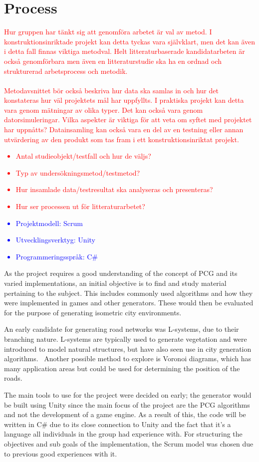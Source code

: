 \section{Process}
\textcolor{red}{
Hur gruppen har tänkt sig att genomföra arbetet är val av metod. I konstruktionsinriktade projekt kan detta tyckas vara självklart, men det kan även i detta fall finnas viktiga metodval. Helt litteraturbaserade kandidatarbeten är också genomförbara men även en litteraturstudie ska ha en ordnad och strukturerad arbetsprocess och metodik.
\\\\
Metodavsnittet bör också beskriva hur data ska samlas in och hur det konstateras hur väl projektets mål har uppfyllts. I praktiska projekt kan detta vara genom mätningar av olika typer. Det kan också vara genom datorsimuleringar. Vilka aspekter är viktiga för att veta om syftet med projektet har uppnåtts? Datainsamling kan också vara en del av en testning eller annan utvärdering av den produkt som tas fram i ett konstruktionsinriktat projekt.
\begin{itemize}
    \item Antal studieobjekt/testfall och hur de väljs?
    \item Typ av undersökningsmetod/testmetod? 
    \item Hur insamlade data/testresultat ska analyseras och presenteras? 
    \item Hur ser processen ut för litteraturarbetet?
\end{itemize}
}
\textcolor{blue}{
\begin{itemize}
    \item Projektmodell: Scrum
    \item Utvecklingsverktyg: Unity
    \item Programmeringsspråk: C\#
\end{itemize}
}

As the project requires a good understanding of the concept of PCG and its varied implementations, an initial objective is to find and study material pertaining to the subject. This includes commonly used algorithms and how they were implemented in games and other generators. These would then be evaluated for the purpose of generating isometric city environments.

An early candidate for generating road networks was L-systems, due to their branching nature. L-systems are typically used to generate vegetation and were introduced to model natural structures, but have also seen use in city generation algorithms.~\cite{yoav-pascal} Another possible method to explore is Voronoi diagrams, which has many application areas but could be used for determining the position of the roads.

The main tools to use for the project were decided on early; the generator would be built using Unity since the main focus of the project are the PCG algorithms and not the development of a game engine. As a result of this, the code will be written in C\# due to its close connection to Unity and the fact that it's a language all individuals in the group had experience with. For structuring the objectives and sub goals of the implementation, the Scrum model was chosen due to previous good experiences with it.
